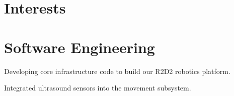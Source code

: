 \documentclass[]{deedy-resume-openfont}
\begin{document}
\begin{minipage}[t]{0.33\textwidth}
\sectionsep


\section{Interests}



\sectionsep


%
%

\end{minipage} 
\hfill
\begin{minipage}[t]{0.66\textwidth} 


\section{Software Engineering}

\sectionsep
{}
\vspace{\topsep} %
\begin{tightemize}
\item Developing core infrastructure code to build our R2D2 robotics platform.
\item Integrated ultrasound sensors into the movement subsystem.
\end{tightemize}
\sectionsep


\end{minipage}
\end{document}
